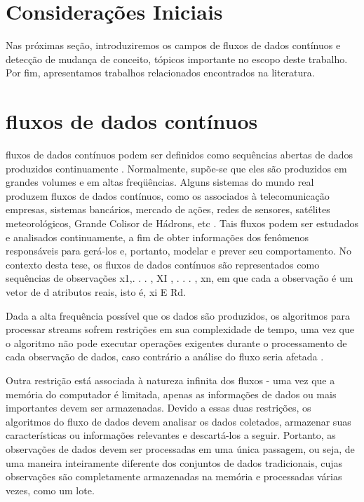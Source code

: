 \documentclass[qual, classic, a4paper]{ufbathesis}
\begin{document}
 \label{revisao_bibliografica}
\section{Considerações Iniciais}

Nas próximas seção, introduziremos os campos de fluxos de dados contínuos e detecção de mudança de conceito, tópicos importante no escopo deste trabalho. Por fim, apresentamos trabalhos relacionados encontrados na literatura.

\section{fluxos de dados contínuos}

fluxos de dados contínuos podem ser definidos como sequências abertas de dados produzidos continuamente \cite{Pavlidis:2011:9AC:1860144.1860487}.
Normalmente, supõe-se que eles são produzidos em grandes volumes e em altas freqüências. Alguns sistemas do mundo real produzem fluxos de dados contínuos, como os associados à telecomunicação empresas, sistemas bancários, mercado de ações, redes de sensores, satélites meteorológicos, Grande Colisor de Hádrons, etc \cite{Guha:2003:CDS:776752.776777}.
Tais fluxos podem ser estudados e analisados continuamente, a fim de obter informações dos fenômenos responsáveis para gerá-los e, portanto, modelar e prever seu comportamento. No contexto desta tese, os fluxos de dados contínuos são representados como sequências de observações x1,. . . , XI , . . . , xn, em que cada a observação é um vetor de d atributos reais, isto é, xi E Rd.

Dada a alta frequência possível que os dados são produzidos, os algoritmos para processar streams sofrem restrições em sua complexidade de tempo, uma vez que o algoritmo não pode executar operações exigentes durante o processamento de cada observação de dados, caso contrário a análise do fluxo seria afetada \cite{EDDM}.

Outra restrição está associada à natureza infinita dos fluxos - uma vez que a memória do computador é limitada, apenas as informações de dados ou mais importantes devem ser armazenadas. Devido a essas duas restrições, os algoritmos do fluxo de dados devem analisar os dados coletados, armazenar suas características ou informações relevantes e descartá-los a seguir. Portanto, as observações de dados devem ser processadas em uma única passagem, ou seja, de uma maneira inteiramente diferente dos conjuntos de dados tradicionais, cujas observações são completamente armazenadas na memória e processadas várias vezes, como um lote.
\end{document}
